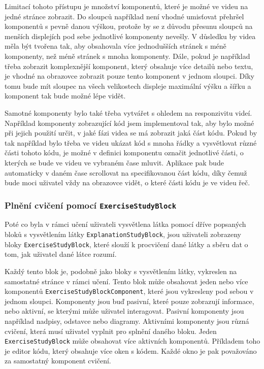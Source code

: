 Limitací tohoto přístupu je množství komponentů, které je možné ve videu na jedné stránce zobrazit. Do sloupců například není vhodné umisťovat přehršel komponentů s pevně danou výškou, protože by se z důvodu přesunu sloupců na menších displejích pod sebe jednotlivé komponenty nevešly. V důsledku by videa měla být tvořena tak, aby obsahovala více jednodušších stránek s méně komponenty, než méně stránek s mnoha komponenty. Dále, pokud je například třeba zobrazit komplexnější komponent, který obsahuje více detailů nebo textu, je vhodné na obrazovce zobrazit pouze tento komponent v jednom sloupci. Díky tomu bude mít sloupec na všech velikostech displeje maximální výšku a šířku a komponent tak bude možné lépe vidět.

Samotné komponenty bylo také třeba vytvářet s ohledem na responzivitu videí. Například komponenty zobrazující kód jsem implementoval tak, aby bylo možné při jejich použití určit, v jaké fázi videa se má zobrazit jaká část kódu. Pokud by tak například bylo třeba ve videu ukázat kód s mnoha řádky a vysvětlovat různé části tohoto kódu, je možné v definici komponentu označit jednotlivé části, o kterých se bude ve videu ve vybraném čase mluvit. Aplikace pak bude automaticky v daném čase scrollovat na specifikovanou část kódu, díky čemuž bude moci uživatel vždy na obrazovce vidět, o které části kódu je ve videu řeč.

\subsubsection{Plnění cvičení pomocí \texttt{ExerciseStudyBlock}}

Poté co byla v rámci učení uživateli vysvětlena látka pomocí dříve popsaných bloků s vysvětlením látky \texttt{ExplanationStudyBlock}, jsou uživateli zobrazeny bloky \texttt{ExerciseStudyBlock}, které slouží k procvičení dané látky a sběru dat o tom, jak uživatel dané látce rozumí.

Každý tento blok je, podobně jako bloky s vysvětlením látky, vykreslen na samostatné stránce v rámci učení. Tento blok může obsahovat jeden nebo více komponentů \texttt{ExerciseStudyBlockComponent}, které jsou vykresleny pod sebou v jednom sloupci. Komponenty jsou buď pasivní, které pouze zobrazují informace, nebo aktivní, se kterými může uživatel interagovat. Pasivní komponenty jsou například nadpisy, odstavce nebo diagramy. Aktivními komponenty jsou různá cvičení, která musí uživatel vyplnit pro splnění daného bloku. Jeden \texttt{ExerciseStudyBlock} může obsahovat více aktivních komponentů. Příkladem toho je editor kódu, který obsahuje více oken s kódem. Každé okno je pak považováno za samostatný komponent cvičení.

